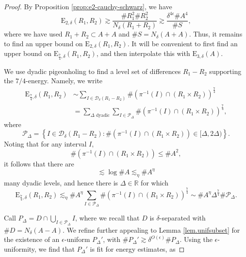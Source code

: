 \documentclass[10pt,a4paper]{amsart}
\newcommand{\cn}[1]{N_\de({#1})}
\newcommand{\de}{\delta}
\begin{document}
\begin{proof}
By Proposition \ref{prop:e2-cauchy-schwarz}, we have
\begin{equation} \label{eq:rr-lower-bound}
	\mathrm{E} _{2,\delta} (R_1,R_2) \gtrsim \frac{\# R_1 ^{2} \# R_2 ^{2}}{\cn{R_1 + R_2}} \gtrsim \frac{\delta^{4\epsilon} \# A ^{4}}{\# S},
\end{equation}
where we have used \(R_{1} + R_{2} \subset A + A\) and \(\# S = N_{\delta} (A+A)\). Thus, it remains to find
an upper bound on \(\mathrm{E} _{2,\delta} (R_1,R_2)\). It will be convenient to first find an
upper bound on \(\mathrm{E} _{\frac{7}{4}  ,\delta} (R_1,R_2)\), and then interpolate this with \(\mathrm{E} _{3,\delta} (A)\).

We use dyadic pigeonholing to find a level set of differences \(R_1-R_2\) supporting the \(7 / 4 \)-energy.
Namely, we write
\begin{align*}
	\mathrm{E} _{\frac{7}{4}  ,\delta} (R_1,R_2) & \sim \sum _{I \in \mathcal{D} _{\delta} (R_1-R_2)} \# \left( \pi ^{-1} (I) \cap (R_1 \times R_2)  \right) ^{\frac{7}{4}  }\\
	& = \sum _{\Delta \text{ dyadic} } \sum _{I \in \mathcal{P} _{\Delta} } \# \left( \pi ^{-1} (I) \cap (R_1 \times R_2) \right) ^{\frac{7}{4}  },
\end{align*}
where
\[
	\mathcal{P} _{\Delta} = \left\{ I \in \mathcal{D} _{\delta} (R_1 - R_2) : \# \left( \pi ^{-1} (I) \cap \left( R_1 \times R_2 \right)  \right) 	\in [\Delta,2\Delta) \right\} 
.\]	
Noting that for any interval \(I\),
\[
	\# \left( \pi ^{-1} (I) \cap (R_1 \times R_2) \right) \leq \# A ^{2}
,\]
it follows that there are
\[
	\lesssim \log \# A \lesssim _{\eta} \# A ^{\eta}
\]
many dyadic levels, and hence there is \(\Delta \in \mathbb{R} \) for which
\[
	\mathrm{E} _{\frac{7}{4} ,\delta} (R_1,R_2) \lesssim _{\eta} \# A ^{\eta} \sum _{I \in \mathcal{P} _{\Delta} } \#\left( \pi ^{-1} (I) \cap (R_1 \times R_2) \right) ^{\frac{7}{4}  } \sim \# A^{\eta} \Delta ^{\frac{7}{4}  } \# \mathcal{P} _{\Delta} 
.\]


Call \(P_{\Delta} = D \cap \bigcup _{I \in \mathcal{P} _{\Delta} } I\), where we recall that \(D\) is \(\delta\)-separated with \(\# D = N_{\delta} (A-A)\). 
We refine further appealing to Lemma \ref{lem.unifsubset} for the existence of
an \(\epsilon\)-uniform \(P_{\Delta} '\), with \(\# P_{\Delta} '\gtrsim \delta^{O(\epsilon)} \# P_{\Delta}  \).
Using the \(\epsilon\)-uniformity, we find that \(P_{\Delta} '\) is fit for energy estimates,
as


\end{proof}
\end{document}

